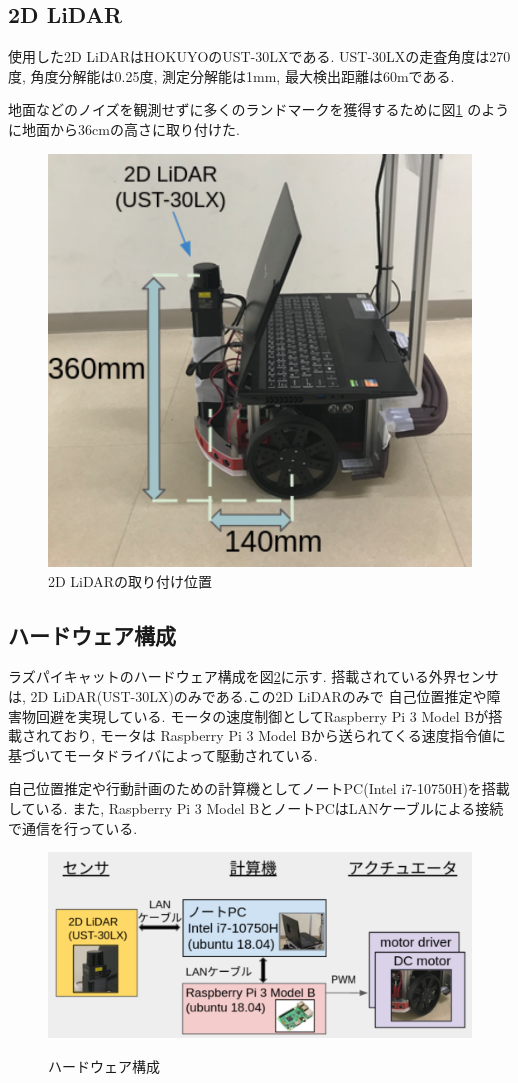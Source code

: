 \subsection{2D LiDAR}
使用した2D LiDARはHOKUYOのUST-30LXである.
UST-30LXの走査角度は270度, 角度分解能は0.25度, 測定分解能は1mm, 最大検出距離は60mである.

地面などのノイズを観測せずに多くのランドマークを獲得するために図\ref{fig:raspicat-lidar}
のように地面から36cmの高さに取り付けた.

\begin{figure}[h]
	\begin{center}
		\includegraphics[width=0.5\linewidth]{figs/raspicat-lidar.pdf}
		\caption{2D LiDARの取り付け位置}
		\label{fig:raspicat-lidar}
	\end{center}
\end{figure}

\subsection{ハードウェア構成}
ラズパイキャットのハードウェア構成を図\ref{fig:raspicat-hardware-config}に示す. 
搭載されている外界センサは, 2D LiDAR(UST-30LX)のみである.この2D LiDARのみで
自己位置推定や障害物回避を実現している. 
モータの速度制御としてRaspberry Pi 3 Model Bが搭載されており, モータは
Raspberry Pi 3 Model Bから送られてくる速度指令値に基づいてモータドライバによって駆動されている.

自己位置推定や行動計画のための計算機としてノートPC(Intel i7-10750H)を搭載している.
また, Raspberry Pi 3 Model BとノートPCはLANケーブルによる接続で通信を行っている.

\begin{figure}[h]
	\begin{center}
		\includegraphics[width=1.0\linewidth]{figs/raspicat-hardware-config.pdf}
		\label{fig:raspicat-hardware-config}
		\caption{ハードウェア構成}
	\end{center}
\end{figure}

